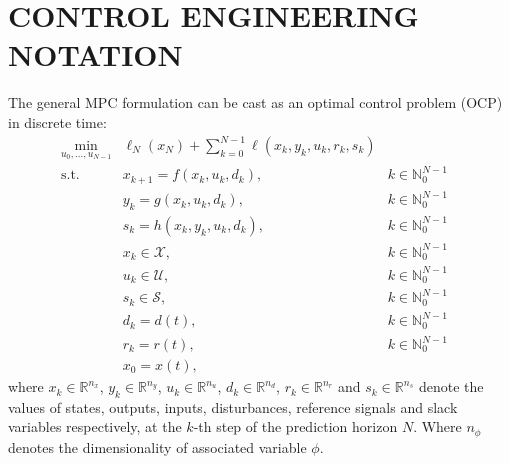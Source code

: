 \documentclass[10pt]{extarticle}
\begin{document}
\section{CONTROL ENGINEERING NOTATION}\label{sec:control_notation}

The general MPC formulation can be cast as an optimal control problem (OCP) in discrete time:
\begin{subequations}
	\label{eq:mpc_general_formal}
	\begin{align}
	\min_{u_0, \ldots, u_{N-1}} & \ell_N(x_N) + \sum_{k=0}^{N-1} \ell(x_k, y_k, u_k, r_k, s_k) &
	\label{eq:mpc_general_formal:cost}\\
	\text{s.t.} \ & x_{k+1} = f(x_k, u_k, d_k),  & k \in \mathbb{N}_{0}^{N-1} & \label{eq:mpc_general_formal:xp} \\
	& y_{k} = g(x_k, u_k, d_k),  & k \in \mathbb{N}_{0}^{N-1} & \label{eq:mpc_general_formal:yp} \\
	& s_{k} = h(x_k, y_k, u_k, d_k),  & k \in \mathbb{N}_{0}^{N-1} & \label{eq:mpc_general_formal:s} \\
	&  x_{k} \in \mathcal{X},  & k \in \mathbb{N}_{0}^{N-1}   \label{eq:mpc_general_formal:xb}\\
	& u_{k} \in \mathcal{U}, & k \in \mathbb{N}_{0}^{N-1} 
	\label{eq:mpc_general_formal:ub}\\
	& s_{k} \in \mathcal{S}, & k \in \mathbb{N}_{0}^{N-1} 
	\label{eq:mpc_general_formal:sb}\\
    & d_k = d(t),  & k \in \mathbb{N}_{0}^{N-1} \label{eq:mpc_general_formal:d0} \\
    & r_k = r(t),  & k \in \mathbb{N}_{0}^{N-1} \label{eq:mpc_general_formal:r0} \\
	& x_0 = x(t),\label{eq:mpc_general_formal:x0} 
	\end{align}
\end{subequations}
where $x_k \in \mathbb{R}^{n_x}$, $y_k \in \mathbb{R}^{n_y}$, $u_k \in \mathbb{R}^{n_u}$, $d_k \in \mathbb{R}^{n_d}$, $r_k \in \mathbb{R}^{n_r}$ and $s_k \in \mathbb{R}^{n_s}$ denote the values of states, outputs,
inputs, disturbances, reference signals and slack variables respectively, at the $k$-th step of the prediction horizon $N$. 
Where $n_{\phi}$ denotes the dimensionality of associated variable $\phi$.
\end{document}
